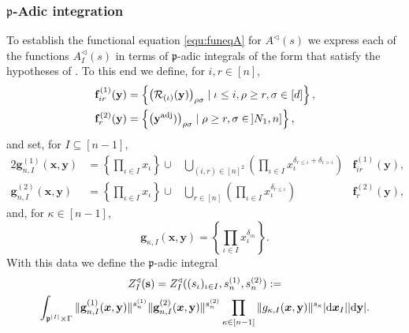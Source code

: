 \documentclass[11pt]{amsart}
\numberwithin{equation}{section}
\numberwithin{figure}{section}
\theoremstyle{plain}
\theoremstyle{definition}
\theoremstyle{remark}
\begin{document}
\subsubsection{${\mathfrak{p}}$-Adic integration}
To establish the functional equation \eqref{equ:funeqA} for
$A^{\triangleleft}(s)$ we express each of the functions $A_I^{\triangleleft}(s)$ in terms
of ${\mathfrak{p}}$-adic integrals of the form \cite[(6)]{Voll/10} that satisfy
the hypotheses of \cite[Theorem~2.3]{Voll/10}. To this end we define,
for $i,r\in[n]$,
\begin{align*}
{\ensuremath{\mathbf{f}}}^{(1)}_{ir}({\ensuremath{\mathbf{y}}}) &= \left\{ \left( {\mathcal{R}}_{(\iota)}({\ensuremath{\mathbf{y}}})\right)_{\rho\sigma} \mid \iota \leq i, \rho \geq r, \sigma \in [d]\right\},\\
{\ensuremath{\mathbf{f}}}^{(2)}_{r}({\ensuremath{\mathbf{y}}}) &= \left\{ \left({\ensuremath{\mathbf{y}}}^{\textup{adj}})\right)_{\rho\sigma} \mid \rho\geq r, \sigma\in\,]N_1,n]\right\},
\end{align*} 
and set, for $I\subseteq[n-1]$,
\begin{alignat*}{2}
  {\ensuremath{\mathbf{g}}}^{(1)}_{n,I}({{\boldsymbol{x}}},{\ensuremath{\mathbf{y}}}) &= \left\{\prod_{\iota\in I}x_{\iota}\right\} \cup &\bigcup_{(i,r)\in[n]^2}\left( \prod_{\iota\in I}x_\iota^{\delta_{r \leq \iota} + \delta_{i > \iota}}\right) &{\ensuremath{\mathbf{f}}}^{(1)}_{ir}({\ensuremath{\mathbf{y}}}),\\
  {\ensuremath{\mathbf{g}}}^{(2)}_{n,I}({{\boldsymbol{x}}},{\ensuremath{\mathbf{y}}}) &= \left\{\prod_{\iota\in
      I}x_{\iota}\right\} \cup & \bigcup_{r\in[n]}\left(
    \prod_{\iota\in I}x_\iota^{\delta_{r \leq \iota} }\right) & {\ensuremath{\mathbf{f}}}^{(2)}_{r}({\ensuremath{\mathbf{y}}}),
\end{alignat*}
and, for $\kappa\in[n-1]$,
$${\ensuremath{\mathbf{g}}}_{\kappa,I}({{\boldsymbol{x}}},{\ensuremath{\mathbf{y}}}) = \left\{\prod_{\iota\in I}x_{\iota}^{\delta_{\iota\kappa}}\right\}.$$
With this data we define the ${\mathfrak{p}}$-adic integral
\begin{multline*}
Z^{\triangleleft}_{I}({\ensuremath{\mathbf{s}}}) = Z^{\triangleleft}_{I}((s_\iota)_{\iota\in
  I},s^{(1)}_n,s^{(2)}_n) :=\\\int_{{\mathfrak{p}}^{|I|} \times \Gamma} \|
{\ensuremath{\mathbf{g}}}^{(1)}_{n,I}({{\boldsymbol{x}}},{\ensuremath{\mathbf{y}}}) \|^{s^{(1)}_n} \|
{\ensuremath{\mathbf{g}}}^{(2)}_{n,I}({{\boldsymbol{x}}},{\ensuremath{\mathbf{y}}}) \|^{s^{(2)}_n}
\prod_{\kappa\in[n-1]}\|g_{\kappa,I}({{\boldsymbol{x}}},{\ensuremath{\mathbf{y}}})\|^{s_\kappa} |{\textup{d}}
{{\boldsymbol{x}}}_I| | {\textup{d}} {\ensuremath{\mathbf{y}}}|.
\end{multline*}
\end{document}
